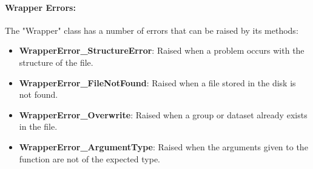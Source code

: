 \paragraph{Wrapper Errors:}
The "Wrapper" class has a number of errors that can be raised by its methods:
\begin{itemize}
    \item \textbf{WrapperError\_StructureError}: Raised when a problem occurs with the structure of the file.
    \item \textbf{WrapperError\_FileNotFound}: Raised when a file stored in the disk is not found.
    \item \textbf{WrapperError\_Overwrite}: Raised when a group or dataset already exists in the file.
    \item \textbf{WrapperError\_ArgumentType}: Raised when the arguments given to the function are not of the expected type.
\end{itemize}
 